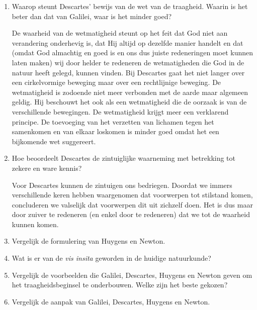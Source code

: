 \begin{enumerate}
\item Waarop steunt Descartes' bewijs van de wet van de traagheid. Waarin is het beter dan dat van
Galilei, waar is het minder goed?
\begin{oplossing}
\newline
De waarheid van de wetmatigheid steunt op het feit dat God niet aan verandering onderhevig is, dat Hij altijd op dezelfde manier handelt en dat (omdat God almachtig en goed is en ons dus juiste redeneringen moet kunnen laten maken) wij door helder te redeneren de wetmatigheden die God in de natuur heeft gelegd, kunnen vinden.
\newline
Bij Descartes gaat het niet langer over een cirkelvormige beweging maar over een rechtlijnige beweging. De wetmatigheid is zodoende niet meer verbonden met de aarde maar algemeen geldig. Hij beschouwt het ook als een wetmatigheid die de oorzaak is van de verschillende bewegingen. De wetmatigheid krijgt meer een verklarend principe. De toevoeging van het verzetten van lichamen tegen het samenkomen en van elkaar loskomen is minder goed omdat het een bijkomende wet suggereert.
\end{oplossing}

\item Hoe beoordeelt Descartes de zintuiglijke waarneming met betrekking tot zekere en ware
kennis?
\begin{oplossing}
\newline
Voor Descartes kunnen de zintuigen ons bedriegen. Doordat we immers verschillende keren hebben waargenomen dat voorwerpen tot stilstand komen, concluderen we valselijk dat voorwerpen dit uit zichzelf doen. Het is dus maar door zuiver te redeneren (en enkel door te redeneren) dat we tot de waarheid kunnen komen.
\end{oplossing}

\item Vergelijk de formulering van Huygens en Newton.

\item Wat is er van de \textit{vis insita} geworden in de huidige natuurkunde?

\item Vergelijk de voorbeelden die Galilei, Descartes, Huygens en Newton geven om het traagheidsbeginsel te onderbouwen. Welke zijn het beste gekozen?
\item Vergelijk de aanpak van Galilei, Descartes, Huygens en Newton.
\end{enumerate}

\clearpage
\newpage


